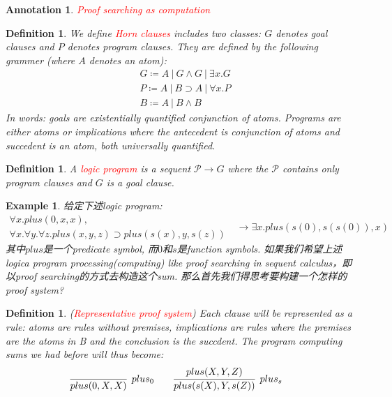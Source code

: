 \documentclass{article}
\theoremstyle{plain}
\newtheorem{example}[theorem]{Example}
\newtheorem{definition}[theorem]{Definition}
\newtheorem{annotation}[theorem]{Annotation}
\theoremstyle{nonumberplain}
\newcommand{\redt}[1]{\textcolor{red}{#1}}
\begin{document}
\begin{annotation}
\rm \redt{Proof searching as computation}
\end{annotation}

\begin{definition}
\rm We define \redt{Horn clauses} includes two classes: $G$ denotes goal clauses and $P$ denotes program clauses. They are defined by the following grammer (where $A$ denotes an atom):
$$
\begin{aligned}
&G \coloneqq A~|~ G \wedge G~|~ \exists x.G \\
&P \coloneqq A~|~ B \supset A~|~ \forall x.P \\
&B \coloneqq A~|~ B \wedge B 
\end{aligned}
$$
In words: goals are existentially quantified conjunction of atoms. Programs are either atoms or implications where the antecedent is conjunction of atoms and succedent is an atom, both universally quantified. 
\end{definition}

\begin{definition}
\rm A \redt{logic program} is a sequent $\mathcal{P} \to G$ where the $\mathcal{P}$ contains only program clauses and $G$ is a goal clause.
\end{definition}

\begin{example}\label{logic-pro-ex1}
\rm 给定下述logic program:
$$
\begin{gathered}
\forall x.plus(0,x,x), \\
\forall x. \forall y. \forall z. plus(x,y,z) \supset plus(s(x),y,s(z))
\end{gathered} ~~~\to
\exists x.plus(s(0),s(s(0)),x) 
$$
其中$plus$是一个predicate symbol, 而$0$和$s$是function symbols. 如果我们希望上述logica program processing(computing) like proof searching in sequent calculus，即以proof searching的方式去构造这个sum. 那么首先我们得思考要构建一个怎样的proof system? 
\end{example}

\begin{definition}
\rm (\redt{Representative proof system}) Each clause will be  represented as a rule: atoms are rules  without premises, implications are rules where the premises are the atoms in B and the conclusion is the succdent. The program computing sums we had before will thus become:
$$
\begin{aligned}
\infer[plus_0]{plus(0,X,X)}{} &&&&& \infer[plus_s]{plus(s(X),Y,s(Z))}{plus(X,Y,Z)}
\end{aligned}
$$ 
\end{definition}
\end{document}
